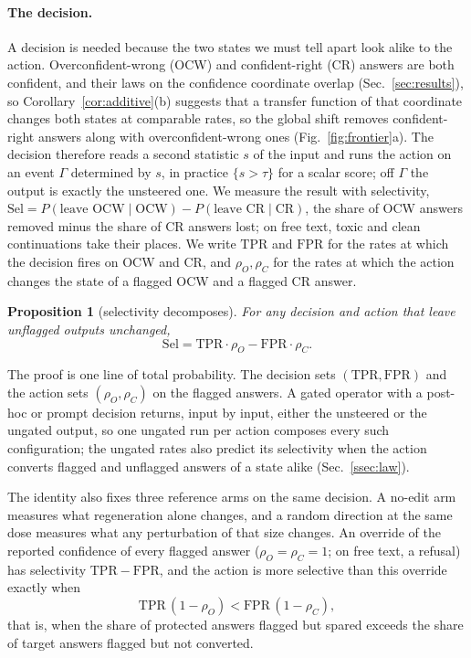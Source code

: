 \documentclass{article}
\newtheorem{proposition}{Proposition}
\newcommand{\ocw}{OCW}
\newcommand{\crok}{CR}
\begin{document}
\paragraph{The decision.} A decision is needed because the two states we must
tell apart look alike to the action. Overconfident-wrong (\ocw{}) and
confident-right (\crok{}) answers are both confident, and their laws on the
confidence coordinate overlap (Sec.~\ref{sec:results}), so
Corollary~\ref{cor:additive}(b) suggests that a transfer function of that
coordinate changes both states at comparable rates, so the global shift
removes confident-right answers along with overconfident-wrong ones
(Fig.~\ref{fig:frontier}a). The decision therefore reads a second statistic
$s$ of the input and runs the action on an event $\Gamma$ determined by $s$, in
practice $\{s>\tau\}$ for a scalar score; off $\Gamma$ the output is exactly
the unsteered one. We measure the result with selectivity,
$\mathrm{Sel}=P(\text{leave \ocw}\mid\text{\ocw})-P(\text{leave \crok}\mid\text{\crok})$,
the share of \ocw{} answers removed minus the share of \crok{} answers lost; on
free text, toxic and clean continuations take their places. We write
$\mathrm{TPR}$ and $\mathrm{FPR}$ for the rates at which the decision fires on
\ocw{} and \crok{}, and $\rho_O,\rho_C$ for the rates at which the action
changes the state of a flagged \ocw{} and a flagged \crok{} answer.

\begin{proposition}[selectivity decomposes]
\label{prop:account}
For any decision and action that leave unflagged outputs unchanged,
\begin{equation}
\mathrm{Sel}=\mathrm{TPR}\cdot\rho_O-\mathrm{FPR}\cdot\rho_C .
\label{eq:account}
\end{equation}
\end{proposition}

The proof is one line of total probability. The decision sets
$(\mathrm{TPR},\mathrm{FPR})$ and the action sets $(\rho_O,\rho_C)$ on the
flagged answers. A gated operator with a post-hoc or prompt decision returns,
input by input, either the unsteered or the ungated output, so one ungated run
per action composes every such configuration; the ungated rates also predict
its selectivity when the action converts flagged and unflagged answers of a
state alike (Sec.~\ref{ssec:law}).

The identity also fixes three reference arms on the same decision. A no-edit
arm measures what regeneration alone changes, and a random direction at the
same dose measures what any perturbation of that size changes. An override of
the reported confidence of every flagged answer ($\rho_O=\rho_C=1$; on free
text, a refusal) has selectivity $\mathrm{TPR}-\mathrm{FPR}$, and the action is
more selective than this override exactly when
\begin{equation}
\mathrm{TPR}\,(1-\rho_O)<\mathrm{FPR}\,(1-\rho_C),
\label{eq:override}
\end{equation}
that is, when the share of protected answers flagged but spared exceeds the
share of target answers flagged but not converted.
\end{document}
